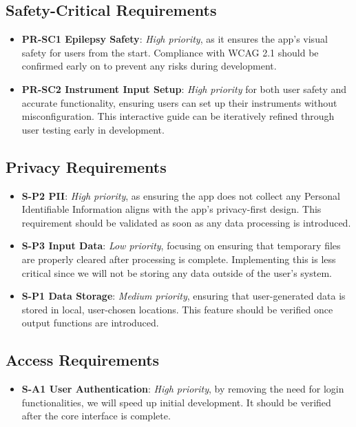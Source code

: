 \documentclass{article}
\begin{document}
\subsection{Safety-Critical Requirements}
\begin{itemize}
    \item \textbf{PR-SC1 Epilepsy Safety}: \textit{High priority}, as it ensures the app’s visual safety for users from the start. Compliance with WCAG 2.1 should be confirmed early on to prevent any risks during development.
    \item \textbf{PR-SC2 Instrument Input Setup}: \textit{High priority} for both user safety and accurate functionality, ensuring users can set up their instruments without misconfiguration. This interactive guide can be iteratively refined through user testing early in development.
\end{itemize}

\subsection{Privacy Requirements}
\begin{itemize}
    \item \textbf{S-P2 PII}: \textit{High priority}, as ensuring the app does not collect any Personal Identifiable Information aligns with the app’s privacy-first design. This requirement should be validated as soon as any data processing is introduced.
    \item \textbf{S-P3 Input Data}: \textit{Low priority}, focusing on ensuring that temporary files are properly cleared after processing is complete. Implementing this is less critical since we will not be storing any data outside of the user’s system.
    \item \textbf{S-P1 Data Storage}: \textit{Medium priority}, ensuring that user-generated data is stored in local, user-chosen locations. This feature should be verified once output functions are introduced.
\end{itemize}

\subsection{Access Requirements}
\begin{itemize}
    \item \textbf{S-A1 User Authentication}: \textit{High priority}, by removing the need for login functionalities, we will speed up initial development. It should be verified after the core interface is complete.
\end{itemize}
\end{document}
